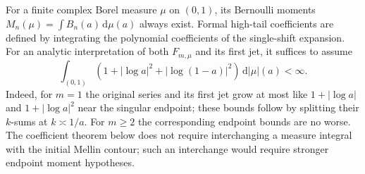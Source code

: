 \documentclass[11pt,a4paper]{article}
\numberwithin{equation}{section}
\theoremstyle{definition}\newtheorem{definition}[theorem]{Definition}
\theoremstyle{remark}\newtheorem{remark}[theorem]{Remark}
\newcommand{\dd}{\,\mathrm d}\newcommand{\Li}{\operatorname{Li}}
\begin{document}
For a finite complex Borel measure $\mu$ on $(0,1)$, its Bernoulli
moments $M_n(\mu)=\int B_n(a)\dd\mu(a)$ always exist. Formal high-tail
coefficients are defined by integrating the polynomial coefficients of
the single-shift expansion. For an analytic interpretation of both
$F_{m,\mu}$ and its first jet, it suffices to assume
\begin{equation}
 \int_{(0,1)}\left(1+|\log a|^2+|\log(1-a)|^2\right)\dd|\mu|(a)<\infty.
 \label{eq:measure-integrability}
\end{equation}
Indeed, for $m=1$ the original series and its first jet grow at most
like $1+|\log a|$ and $1+|\log a|^2$ near the singular endpoint;
these bounds follow by splitting their $k$-sums at $k\asymp1/a$.
For $m\ge2$ the corresponding endpoint bounds are no worse.
The coefficient theorem below does not require interchanging a measure integral with the initial Mellin contour; such an interchange would require stronger endpoint moment hypotheses.
\end{document}
